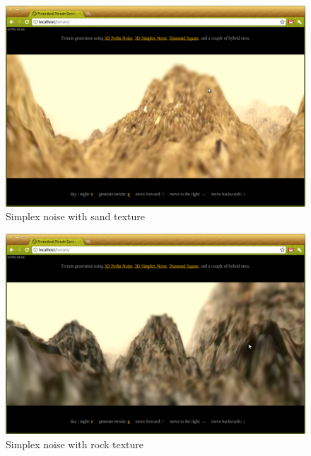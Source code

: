\begin{figure}
	\center
	\includegraphics[scale=0.4]{images/demo_3_2.png}
	\caption{Simplex noise with sand texture}
	\label{fig:demo_3_2}
\end{figure}
\begin{figure}
	\center
	\includegraphics[scale=0.4]{images/demo_3_3.png}
	\caption{Simplex noise with rock texture}
	\label{fig:demo_3_3}
\end{figure}
